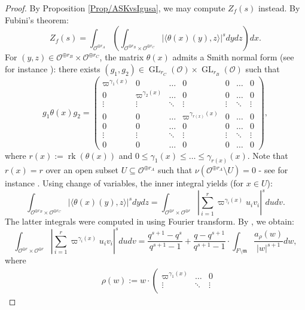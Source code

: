 \documentclass[11pt,english]{article}
\numberwithin{equation}{section}
\numberwithin{figure}{section}
\theoremstyle{definition}
\theoremstyle{plain}
\theoremstyle{remark}
\DeclareMathOperator{\GL}{GL}
\DeclareMathOperator{\rk}{rk}
\begin{document}
\begin{proof}

By Proposition \ref{Prop/ASKvsIgusa}, we may compute $Z_{f}(s)$
instead. By Fubini's theorem:\[
Z_f(s)=\int_{\mathcal{O}^{\oplus r_A}}\left(\int_{\mathcal{O}^{\oplus r_B}\times\mathcal{O}^{\oplus r_C}}\vert\langle\theta(x)(y),z\rangle\vert^s dydz \right) dx.
\]For $(y,z)\in\mathcal{O}^{\oplus r_{B}}\times\mathcal{O}^{\oplus r_{C}}$,
the matrix $\theta(x)$ admits a Smith normal form (see for instance
\cite{Sta16}): there exists $(g_{1},g_{2})\in\GL_{r_{C}}(\mathcal{O})\times\GL_{r_{B}}(\mathcal{O})$
such that\[
g_{1}\theta(x)g_{2}=
\left(
\begin{array}{ccccccc}
\varpi^{\gamma_1(x)} & 0 & \ldots & 0 & 0 & \ldots & 0 \\
0 & \varpi^{\gamma_2(x)} & \ldots & 0 & 0 & \ldots & 0 \\
\vdots & \vdots & \ddots & \vdots & \vdots & \ddots & \vdots \\
0 & 0 & \ldots & \varpi^{\gamma_{r(x)}(x)} & 0 & \ldots & 0 \\
0 & 0 & \ldots & 0 & 0 & \ldots & 0 \\
\vdots & \vdots & \ddots &  \vdots & \vdots & \ddots & \vdots \\
0 & 0 & \ldots & 0 & 0 & \ldots & 0
\end{array}
\right),
\]where $r(x):=\rk(\theta(x))$ and $0\leq\gamma_{1}(x)\leq\ldots\leq\gamma_{r(x)}(x)$.
Note that $r(x)=r$ over an open subset $U\subseteq\mathcal{O}^{\oplus r_{A}}$
such that $\nu(\mathcal{O}^{\oplus r_{A}}\setminus U)=0$ - see for
instance \cite[Prop. 1.4.3.]{CLNS18}. Using change of variables,
the inner integral yields (for $x\in U$):\[
\int_{\mathcal{O}^{\oplus r_B}\times\mathcal{O}^{\oplus r_C}}\vert\langle\theta(x)(y),z\rangle\vert^s dydz
=
\int_{\mathcal{O}^{\oplus r}\times\mathcal{O}^{\oplus r}}\left\vert\sum_{i=1}^r\varpi^{\gamma_i(x)}u_iv_i\right\vert^s dudv.
\]The latter integrals were computed in \cite[\S 4.]{Wys17b} using
Fourier transform. By \cite[Cor. 4.14.]{Wys17b}, we obtain:\[
\int_{\mathcal{O}^{\oplus r}\times\mathcal{O}^{\oplus r}}\left\vert\sum_{i=1}^r\varpi^{\gamma_i(x)}u_iv_i\right\vert^s dudv
=
\frac{q^{s+1}-q^s}{q^{s+1}-1}
+
\frac{q-q^{s+1}}{q^{s+1}-1}
\cdot
\int_{F\setminus\mathfrak{m}}\frac{a_{\rho}(w)}{\vert w\vert^{s+1}}dw,
\]where\begin{align*}
& \rho(w):=w\cdot
\left(
\begin{array}{ccc}
\varpi^{\gamma_1(x)} & \ldots & 0 \\
\vdots & \ddots & \vdots \\

\end{array}
\end{align*}
\end{proof}
\end{document}
